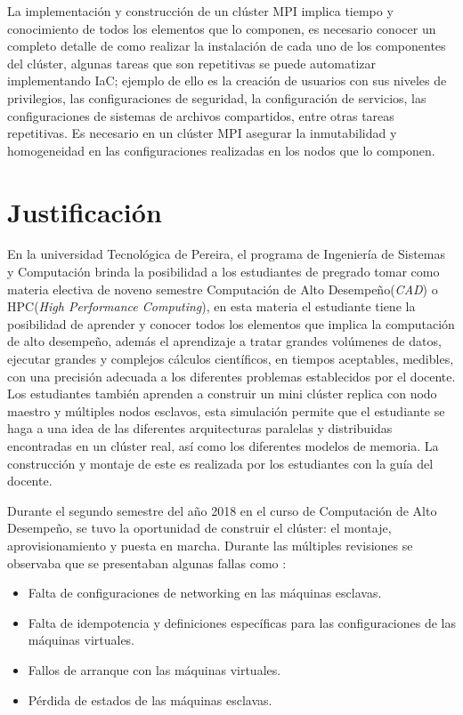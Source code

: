 \documentclass[letterpaper, 12pt, oneside]{article}
\begin{document}
    La implementación y construcción de un clúster MPI implica  tiempo y conocimiento de todos los elementos que lo componen, es necesario conocer un completo detalle de como realizar la instalación de cada uno de los componentes del clúster, algunas tareas que son repetitivas se puede automatizar implementando IaC; ejemplo de ello es la creación de usuarios con sus niveles de privilegios, las configuraciones de seguridad, la configuración de servicios, las configuraciones de sistemas de archivos compartidos, entre otras tareas repetitivas. Es necesario en un clúster MPI asegurar la inmutabilidad y homogeneidad en las configuraciones realizadas en los nodos que lo componen.\cite{repositoriounal}
    \clearpage
    
    \section{Justificación}
    En la universidad Tecnológica de Pereira, el programa de Ingeniería de Sistemas y Computación brinda la posibilidad a los estudiantes de pregrado tomar como materia electiva de noveno semestre Computación de Alto Desempeño(\textit{CAD}) o HPC(\textit{High Performance Computing}), en esta materia el estudiante tiene la posibilidad de aprender y conocer todos los elementos que implica la computación de alto desempeño, además el aprendizaje a tratar grandes volúmenes de datos, ejecutar grandes y complejos cálculos científicos, en tiempos aceptables, medibles, con una precisión adecuada a los diferentes problemas establecidos por el docente. Los estudiantes también aprenden a construir un mini clúster replica con nodo maestro y múltiples nodos esclavos, esta simulación permite que el estudiante se haga a una idea de las diferentes arquitecturas paralelas y distribuidas encontradas en un clúster real, así como los diferentes modelos de memoria. La construcción y montaje de este es realizada por los estudiantes con la guía del docente. 
    
    Durante el segundo semestre del año 2018 en el curso de Computación de Alto Desempeño, se tuvo la oportunidad de construir el clúster: el montaje, aprovisionamiento y puesta en marcha. Durante las múltiples revisiones se observaba que se presentaban algunas fallas como : 
    
    \begin{itemize}
        \item Falta de configuraciones de networking en las máquinas esclavas.
        \item Falta de idempotencia y definiciones específicas para las configuraciones de las máquinas virtuales.
        \item Fallos de arranque con las máquinas virtuales.
        \item Pérdida de estados de las máquinas esclavas.
    \end{itemize}
    
\end{document}
